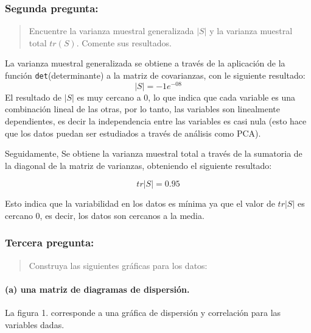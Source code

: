 \documentclass[
]{article}
\begin{document}
\hypertarget{segunda-pregunta}{%
\subsubsection{Segunda pregunta:}\label{segunda-pregunta}}

\begin{quote}
Encuentre la varianza muestral generalizada \(|S|\) y la varianza
muestral total \(tr(S)\). Comente sus resultados.
\end{quote}

La varianza muestral generalizada se obtiene a través de la aplicación
de la función \texttt{det}(determinante) a la matriz de covarianzas, con
le siguiente resultado: \[
|S| = -1e^{-08}
\] El resultado de \(|S|\) es muy cercano a \(0\), lo que indica que
cada variable es una combinación lineal de las otras, por lo tanto, las
variables son linealmente dependientes, es decir la independencia entre
las variables es casi nula (esto hace que los datos puedan ser
estudiados a través de análisis como PCA).

Seguidamente, Se obtiene la varianza muestral total a través de la
sumatoria de la diagonal de la matriz de varianzas, obteniendo el
siguiente resultado:

\[
    tr|S| = 0.95
\]

Esto indica que la variabilidad en los datos es mínima ya que el valor
de \(tr|S|\) es cercano \(0\), es decir, los datos son cercanos a la
media.

\hypertarget{tercera-pregunta}{%
\subsubsection{Tercera pregunta:}\label{tercera-pregunta}}

\begin{quote}
Construya las siguientes gráficas para los datos:
\end{quote}

\hypertarget{a-una-matriz-de-diagramas-de-dispersiuxf3n.}{%
\paragraph{(a) una matriz de diagramas de
dispersión.}\label{a-una-matriz-de-diagramas-de-dispersiuxf3n.}}

La figura 1. corresponde a una gráfica de dispersión y correlación para
las variables dadas.
\end{document}
